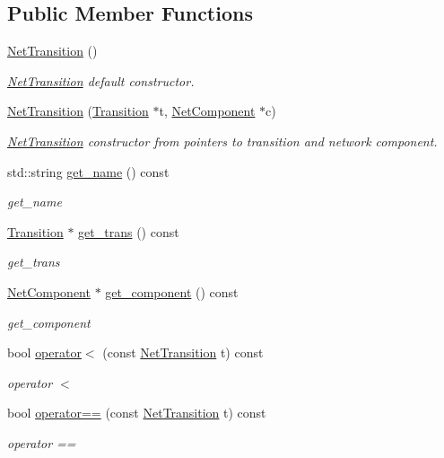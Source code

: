 \subsection*{Public Member Functions}
\begin{DoxyCompactItemize}
\item 
\hyperlink{class_net_transition_a6d3928f521a06cf6b0220175b05e757a}{Net\+Transition} ()\hypertarget{class_net_transition_a6d3928f521a06cf6b0220175b05e757a}{}\label{class_net_transition_a6d3928f521a06cf6b0220175b05e757a}

\begin{DoxyCompactList}\small\item\em \hyperlink{class_net_transition}{Net\+Transition} default constructor. \end{DoxyCompactList}\item 
\hyperlink{class_net_transition_a958eafdf83fb7cd1dd562a4ac48d668f}{Net\+Transition} (\hyperlink{class_transition}{Transition} $\ast$t, \hyperlink{class_net_component}{Net\+Component} $\ast$c)
\begin{DoxyCompactList}\small\item\em \hyperlink{class_net_transition}{Net\+Transition} constructor from pointers to transition and network component. \end{DoxyCompactList}\item 
std\+::string \hyperlink{class_net_transition_a6058715be2b7de07b7f1be57e5ccb1bb}{get\+\_\+name} () const 
\begin{DoxyCompactList}\small\item\em get\+\_\+name \end{DoxyCompactList}\item 
\hyperlink{class_transition}{Transition} $\ast$ \hyperlink{class_net_transition_ae422d809c42771fab328b22378c80af5}{get\+\_\+trans} () const 
\begin{DoxyCompactList}\small\item\em get\+\_\+trans \end{DoxyCompactList}\item 
\hyperlink{class_net_component}{Net\+Component} $\ast$ \hyperlink{class_net_transition_aa03cb562c3191612bc675172b0b5c90c}{get\+\_\+component} () const 
\begin{DoxyCompactList}\small\item\em get\+\_\+component \end{DoxyCompactList}\item 
bool \hyperlink{class_net_transition_ac7d094a518dfdfb784c42702a3db5f9d}{operator$<$} (const \hyperlink{class_net_transition}{Net\+Transition} t) const 
\begin{DoxyCompactList}\small\item\em operator $<$ \end{DoxyCompactList}\item 
bool \hyperlink{class_net_transition_ac7674acf1b41977ebafd99812c648746}{operator==} (const \hyperlink{class_net_transition}{Net\+Transition} t) const 
\begin{DoxyCompactList}\small\item\em operator == \end{DoxyCompactList}\end{DoxyCompactItemize}
